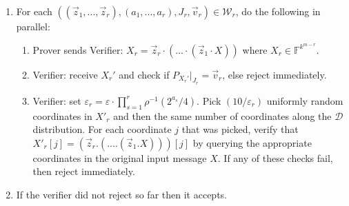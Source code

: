 \documentclass[11pt]{article}
\makeatletter
\newcommand{\F}{\mathbb{F}}
\newenvironment{protocol}[1][htb]{
    \renewcommand{\ALG@name}{Protocol}
    \begin{algorithm}[#1]
    }{\end{algorithm}
}
\makeatother
\begin{document}
\begin{protocol}
\begin{enumerate}
    \item For each $((\vec{z}_{1}, . . . , \vec{z}_{r}),(a_{1}, . . . , a_{r}), J_{r}, \vec{v}_{r}) \in \mathcal{W}_{r}$, do the following in parallel:
    \begin{enumerate}
        \item \label{SentX} Prover sends Verifier: $X_{r} = \vec{z}_{r} \cdot (. . . \cdot (\vec{z}_{1} \cdot X))$ where $X_r \in \F^{k^{m-r}}$.
        \item Verifier: receive $X_{r}'$ and check if $P_{X_{r}'}|_{J_{r}} = \vec{v}_{r}$, else reject immediately.
        \item\label{MainIPPQueries} Verifier: set $\varepsilon_{r} = \varepsilon \cdot \prod_{s=1}^{r}\rho^{-1}(2^{a_{s}} /4)$. Pick $(10/\varepsilon_{r})$ uniformly random coordinates in $X'_{r}$ and then the same number of coordinates along the $\mathcal{D}$ distribution. For each coordinate $j$ that was picked, verify that $X'_{r}[j] = (\vec{z}_{r} . (. . . . (\vec{z}_{1} . X)))[j]$ by querying the appropriate coordinates in the original input message $X$. If any of these checks fail, then reject immediately.
    \end{enumerate}
    \item If the verifier did not reject so far then it accepts.
\end{enumerate}
\end{protocol}
\end{document}
